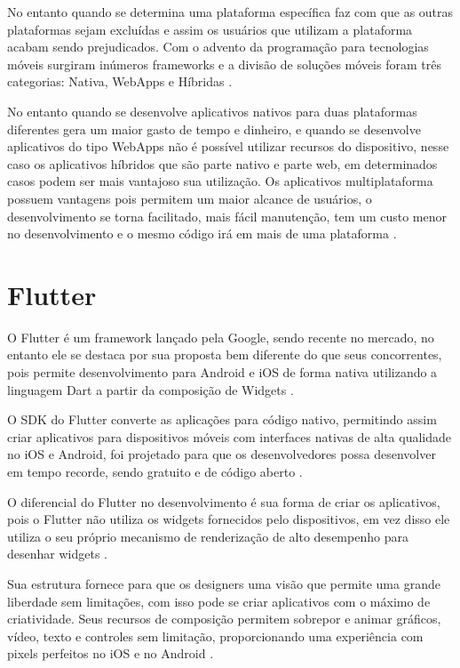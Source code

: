 \documentclass{ifto-tex}
\begin{document}
	No entanto quando se determina uma plataforma específica faz com que as outras plataformas sejam excluídas e assim os usuários que utilizam a plataforma acabam sendo prejudicados.
	Com o advento da programação para tecnologias móveis surgiram inúmeros frameworks e a divisão de soluções móveis foram três categorias: Nativa, WebApps e Híbridas \cite{Desenvol53:online}.
	
	No entanto quando se desenvolve aplicativos nativos para duas plataformas diferentes gera um maior gasto de tempo e dinheiro, e quando se desenvolve aplicativos do tipo WebApps não é possível utilizar recursos do dispositivo, nesse caso os aplicativos híbridos que são parte nativo e parte web, em determinados casos podem ser mais vantajoso sua utilização.
	Os aplicativos multiplataforma possuem vantagens pois permitem um maior alcance de usuários, o desenvolvimento se torna facilitado, mais fácil manutenção, tem um custo menor no desenvolvimento e o mesmo código irá em mais de uma plataforma \cite{Benefits70:online}.
	
	
	\section{Flutter}
O Flutter é um framework lançado pela Google, sendo recente no mercado, no entanto ele se destaca por sua proposta bem diferente do que seus concorrentes, pois permite desenvolvimento para Android e iOS de forma nativa utilizando a linguagem Dart a partir da composição de Widgets \cite{Conhecen37:online}.

O SDK do Flutter converte as aplicações para código nativo, permitindo assim criar aplicativos para dispositivos móveis com interfaces nativas de alta qualidade no iOS e Android, foi projetado para que os desenvolvedores possa desenvolver em tempo recorde, sendo gratuito e de código aberto \cite{flutterf54:online}.

O diferencial do Flutter no desenvolvimento é sua forma de criar os aplicativos, pois o Flutter não utiliza os widgets fornecidos pelo dispositivos, em vez disso ele utiliza o seu próprio mecanismo de renderização de alto desempenho para desenhar widgets \cite{corazza2018aplicativo}.

Sua estrutura fornece para que os designers uma visão que permite uma grande liberdade sem limitações, com isso pode se criar aplicativos com o máximo de criatividade. Seus recursos de composição permitem sobrepor e animar gráficos, vídeo, texto e controles sem limitação, proporcionando uma experiência com pixels perfeitos no iOS e no Android \cite{flutterf54:online}.
\end{document}
